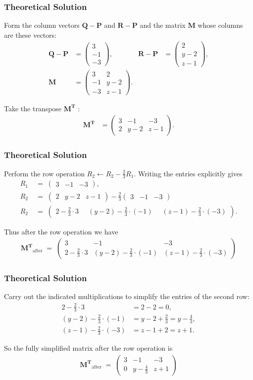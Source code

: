 \documentclass{beamer}
\theoremstyle{remark}
\newcommand{\myvec}[1]{\ensuremath{\begin{pmatrix}#1\end{pmatrix}}}
\let\vec\mathbf
\numberwithin{equation}{section}
\begin{document}
\begin{frame}
\frametitle{Theoretical Solution}
Form the column vectors $\vec{Q-P}$ and $\vec{R-P}$ and the matrix $\vec{M}$ whose columns are these vectors:
\begin{align}
\vec{Q-P} &= \myvec{3\\-1\\-3}, & \vec{R-P} &= \myvec{2\\y-2\\z-1},\\[6pt]
\vec{M} &= \myvec{3 & 2 \\ -1 & y-2 \\ -3 & z-1}.
\end{align}

Take the transpose $\vec{M^{\!T}}$ :
\begin{align}
\vec{M^{\!T}} &= \myvec{3 & -1 & -3 \\[4pt] 2 & y-2 & z-1 }.
\end{align}
\end{frame}

\begin{frame}
\frametitle{Theoretical Solution}
Perform the row operation \(R_2 \leftarrow R_2 - \tfrac{2}{3}R_1\).  Writing the entries explicitly gives
\begin{align}
R_1 &\;=\; \myvec{3 & -1 & -3}, \\[4pt]
R_2 &\;=\; \myvec{2 & y-2 & z-1} - \tfrac{2}{3}\myvec{3 & -1 & -3} \\[4pt]
 R_2 &    \;=\; \myvec{2 - \tfrac{2}{3}\cdot 3 \; &\; (y-2) - \tfrac{2}{3}\cdot(-1) \; &\; (z-1) - \tfrac{2}{3}\cdot(-3)}.
\end{align}

Thus after the row operation we have
\begin{align}
\vec{M^{\!T}}_{\text{after}} \;=\;
\myvec{
3 & -1 & -3 \\[4pt]
2 - \tfrac{2}{3}\cdot 3 & (y-2) - \tfrac{2}{3}\cdot(-1) & (z-1) - \tfrac{2}{3}\cdot(-3)
}
\end{align}

\end{frame}

\begin{frame}
\frametitle{Theoretical Solution}
Carry out the indicated multiplications to simplify the entries of the second row:
\begin{align}
2 - \tfrac{2}{3}\cdot 3 &= 2 - 2 = 0,\\[4pt]
(y-2) - \tfrac{2}{3}\cdot(-1) &= y - 2 + \tfrac{2}{3} = y - \tfrac{4}{3},\\[4pt]
(z-1) - \tfrac{2}{3}\cdot(-3) &= z - 1 + 2 = z + 1.
\end{align}

So the fully simplified matrix after the row operation is
\begin{align}
\vec{M^{\!T}}_{\text{after}} \;=\;
\myvec{
3 & -1 & -3 \\[4pt]
0 & y - \tfrac{4}{3} & z + 1
}
\end{align}


\end{frame}
\end{document}
